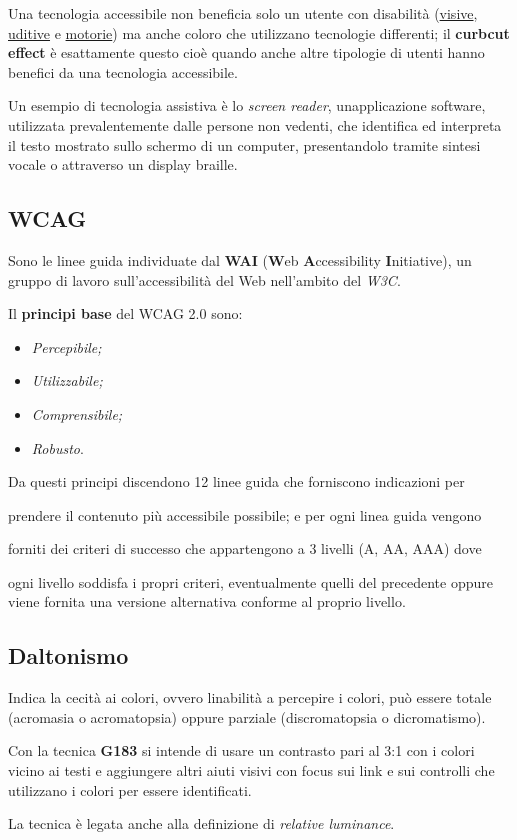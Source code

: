 Una tecnologia accessibile non beneficia solo un utente con disabilità
(\ul{visive}, \ul{uditive} e \ul{motorie}) ma anche coloro che
utilizzano tecnologie differenti; il \textbf{curbcut effect} è
esattamente questo cioè quando anche altre tipologie di utenti hanno
benefici da una tecnologia accessibile.

Un esempio di tecnologia assistiva è lo \emph{screen reader},
un\textquotesingle applicazione software, utilizzata prevalentemente
dalle persone non vedenti, che identifica ed interpreta il testo
mostrato sullo schermo di un computer, presentandolo tramite sintesi
vocale o attraverso un display braille.

\subsection{WCAG}\label{wcag}

Sono le linee guida individuate dal \textbf{WAI} (\textbf{W}eb
\textbf{A}ccessibility \textbf{I}nitiative), un gruppo di lavoro
sull'accessibilità del Web nell'ambito del \emph{W3C}.

Il \textbf{principi base} del WCAG 2.0 sono:

\begin{itemize}
\item
  \emph{Percepibile;}
\item
  \emph{Utilizzabile;}
\item
  \emph{Comprensibile;}
\item
  \emph{Robusto}.
\end{itemize}

Da questi principi discendono 12 linee guida che forniscono indicazioni
per

prendere il contenuto più accessibile possibile; e per ogni linea guida
vengono

forniti dei criteri di successo che appartengono a 3 livelli (A, AA,
AAA) dove

ogni livello soddisfa i propri criteri, eventualmente quelli del
precedente oppure viene fornita una versione alternativa conforme al
proprio livello.

\subsection{Daltonismo}\label{daltonismo}

Indica la cecità ai colori, ovvero l\textquotesingle inabilità a
percepire i colori, può essere totale (acromasia o acromatopsia) oppure
parziale (discromatopsia o dicromatismo).

Con la tecnica \textbf{G183} si intende di usare un contrasto pari al
3:1 con i colori vicino ai testi e aggiungere altri aiuti visivi con
focus sui link e sui controlli che utilizzano i colori per essere
identificati.

La tecnica è legata anche alla definizione di \emph{relative luminance}.

